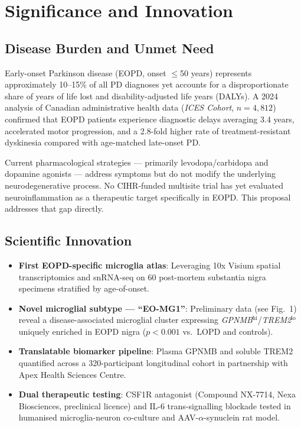 \section{Significance and Innovation}

\subsection{Disease Burden and Unmet Need}

Early-onset Parkinson disease (EOPD, onset $\leq$50 years) represents approximately 10--15\% of all PD diagnoses yet accounts for a disproportionate share of years of life lost and disability-adjusted life years (DALYs). A 2024 analysis of Canadian administrative health data (\textit{ICES Cohort}, $n = 4{,}812$) confirmed that EOPD patients experience diagnostic delays averaging 3.4 years, accelerated motor progression, and a 2.8-fold higher rate of treatment-resistant dyskinesia compared with age-matched late-onset PD.

Current pharmacological strategies --- primarily levodopa/carbidopa and dopamine agonists --- address symptoms but do not modify the underlying neurodegenerative process. No CIHR-funded multisite trial has yet evaluated neuroinflammation as a therapeutic target specifically in EOPD. This proposal addresses that gap directly.

\subsection{Scientific Innovation}

\begin{tcolorbox}[cihrbox, title={\faLightbulb\enspace Key Innovations}]
  \begin{itemize}[leftmargin=14pt, itemsep=2pt, topsep=2pt]
    \item \textbf{First EOPD-specific microglia atlas}: Leveraging 10x Visium spatial transcriptomics and snRNA-seq on 60 post-mortem substantia nigra specimens stratified by age-of-onset.
    \item \textbf{Novel microglial subtype --- ``EO-MG1''}: Preliminary data (see Fig.\ 1) reveal a disease-associated microglial cluster expressing \textit{GPNMB$^{\text{hi}}$}/\textit{TREM2$^{\text{lo}}$} uniquely enriched in EOPD nigra ($p < 0.001$ vs.\ LOPD and controls).
    \item \textbf{Translatable biomarker pipeline}: Plasma GPNMB and soluble TREM2 quantified across a 320-participant longitudinal cohort in partnership with Apex Health Sciences Centre.
    \item \textbf{Dual therapeutic testing}: CSF1R antagonist (Compound NX-7714, Nexa Biosciences, preclinical licence) and IL-6 trans-signalling blockade tested in humanised microglia-neuron co-culture and AAV-$\alpha$-synuclein rat model.
  \end{itemize}
\end{tcolorbox}

